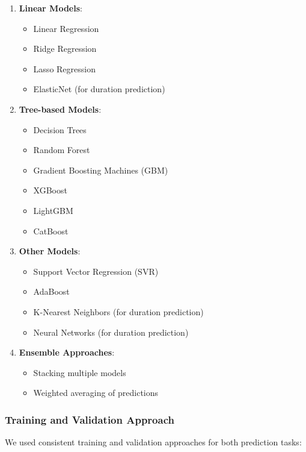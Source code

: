 \documentclass[12pt,letterpaper]{article}
\begin{document}
\begin{enumerate}
    \item \textbf{Linear Models}:
    \begin{itemize}
        \item Linear Regression
        \item Ridge Regression
        \item Lasso Regression
        \item ElasticNet (for duration prediction)
    \end{itemize}

    \item \textbf{Tree-based Models}:
    \begin{itemize}
        \item Decision Trees
        \item Random Forest
        \item Gradient Boosting Machines (GBM)
        \item XGBoost
        \item LightGBM
        \item CatBoost
    \end{itemize}

    \item \textbf{Other Models}:
    \begin{itemize}
        \item Support Vector Regression (SVR)
        \item AdaBoost
        \item K-Nearest Neighbors (for duration prediction)
        \item Neural Networks (for duration prediction)
    \end{itemize}

    \item \textbf{Ensemble Approaches}:
    \begin{itemize}
        \item Stacking multiple models
        \item Weighted averaging of predictions
    \end{itemize}
\end{enumerate}

\subsubsection{Training and Validation Approach}

We used consistent training and validation approaches for both prediction tasks:
\end{document}
